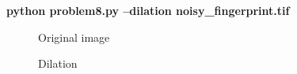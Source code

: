 \textbf{python problem8.py --dilation noisy\_fingerprint.tif}

\begin{figure}[!htb]\centering
    \begin{minipage}{0.45\textwidth}
        \caption{\small{Original image}}
    \end{minipage}
    \begin{minipage}{0.45\textwidth}
        \caption{\small{Dilation}}\label{diagram:dilation}
    \end{minipage}
\end{figure}

